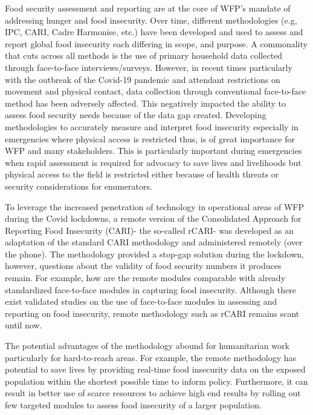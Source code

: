 \documentclass[11pt,harvard]{article}
\begin{document}
	Food security assessment and reporting are at the core of WFP’s mandate of addressing hunger and food insecurity. Over time, different methodologies (e.g, IPC, CARI, Cadre Harmonise, etc.) have been developed and used to assess and report global food insecurity each differing in scope, and purpose. A commonality that cuts across all methods is the use of primary household data collected through face-to-face interviews/surveys. However, in recent times particularly with the outbreak of the Covid-19 pandemic and attendant restrictions on movement and physical contact, data collection through conventional face-to-face method has been adversely affected. This negatively impacted the ability to assess food security needs because of the data gap created. Developing methodologies to accurately measure and interpret food insecurity especially in emergencies where physical access is restricted thus, is of great importance for WFP and many stakeholders. This is particularly important during emergencies when rapid assessment is required for advocacy to save lives and livelihoods but physical access to the field is restricted either because of health threats or security considerations for enumerators. 
	
	To leverage the increased penetration of technology in operational areas of WFP during the Covid lockdowns, a remote version of the Consolidated Approach for Reporting Food Insecurity (CARI)- the so-called rCARI- was developed as an adaptation of the standard CARI methodology and administered remotely (over the phone). The methodology provided a stop-gap solution during the lockdown, however, questions about the validity of food security numbers it produces remain. For example, how are the remote modules comparable with already standardized face-to-face modules in capturing food insecurity. Although there exist validated studies on the use of face-to-face modules in assessing and reporting on food insecurity, remote methodology such as rCARI remains scant until now. 
	
	The potential advantages of the methodology abound for humanitarian work particularly for hard-to-reach areas. For example, the remote methodology has potential to save lives by providing real-time food insecurity data on the exposed population within the shortest possible time to inform policy. Furthermore, it can result in better use of scarce resources to achieve high end results by rolling out few targeted modules to assess food insecurity of a larger population.  	
	
\end{document}
